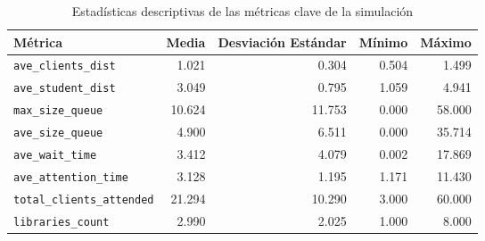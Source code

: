 \documentclass[10pt,twocolumn]{article}
\begin{document}
\begin{table*}[h!]
	\centering
	\begin{tabular}{lrrrr}
		\hline
		\textbf{Métrica}                  & \textbf{Media} & \textbf{Desviación Estándar} & \textbf{Mínimo} & \textbf{Máximo} \\
		\hline
		\texttt{ave\_clients\_dist}       & 1.021          & 0.304                        & 0.504           & 1.499           \\
		\texttt{ave\_student\_dist}       & 3.049          & 0.795                        & 1.059           & 4.941           \\
		\texttt{max\_size\_queue}         & 10.624         & 11.753                       & 0.000           & 58.000          \\
		\texttt{ave\_size\_queue}         & 4.900          & 6.511                        & 0.000           & 35.714          \\
		\texttt{ave\_wait\_time}          & 3.412          & 4.079                        & 0.002           & 17.869          \\
		\texttt{ave\_attention\_time}     & 3.128          & 1.195                        & 1.171           & 11.430          \\
		\texttt{total\_clients\_attended} & 21.294         & 10.290                       & 3.000           & 60.000          \\
		\texttt{libraries\_count}         & 2.990          & 2.025                        & 1.000           & 8.000           \\
		\hline
	\end{tabular}
	\caption{Estadísticas descriptivas de las métricas clave de la simulación}
	\label{tab:descriptive_stats}
\end{table*}
\end{document}
